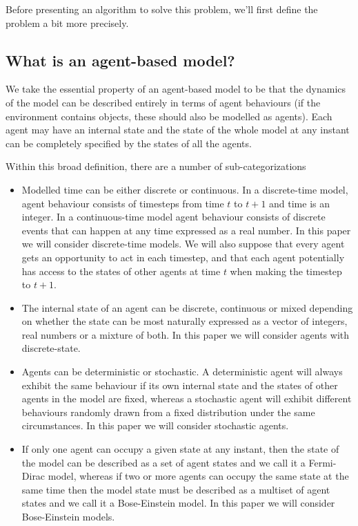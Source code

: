 \documentclass{article}
\begin{document}
Before presenting an algorithm to solve this problem, we'll first define the problem a bit more precisely.

\subsection{What is an agent-based model?}

We take the essential property of an agent-based model to be that the dynamics of the model can be described entirely in terms of agent behaviours (if the environment contains objects, these should also be modelled as agents). Each agent may have an internal state and the state of the whole model at any instant can be completely specified by the states of all the agents.

Within this broad definition, there are a number of sub-categorizations
\begin{itemize}

\item Modelled time can be either discrete or continuous. In a discrete-time model, agent behaviour consists of timesteps from time $t$ to $t+1$ and time is an integer. In a continuous-time model agent behaviour consists of discrete events that can happen at any time expressed as a real number. In this paper we will consider discrete-time models. We will also suppose that every agent gets an opportunity to act in each timestep, and that each agent potentially has access to the states of other agents at time $t$ when making the timestep to $t+1$.

\item The internal state of an agent can be discrete, continuous or mixed depending on whether the state can be most naturally expressed as a vector of integers, real numbers or a mixture of both. In this paper we will consider agents with discrete-state. 

\item Agents can be deterministic or stochastic. A deterministic agent will always exhibit the same behaviour if its own internal state and the states of other agents in the model are fixed, whereas a stochastic agent will exhibit different behaviours randomly drawn from a fixed distribution under the same circumstances. In this paper we will consider stochastic agents.

\item If only one agent can occupy a given state at any instant, then the state of the model can be described as a set of agent states and we call it a Fermi-Dirac model, whereas if two or more agents can occupy the same state at the same time then the model state must be described as a multiset\cite{blizard1988multiset} of agent states and we call it a Bose-Einstein model. In this paper we will consider Bose-Einstein models.

\end{itemize}
\end{document}
